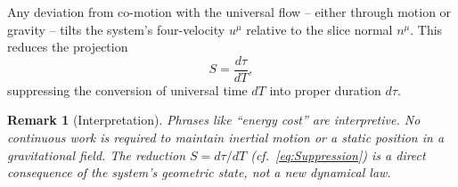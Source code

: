 \documentclass[12pt]{article}
\theoremstyle{plain} %
\newtheorem{remark}{Remark}
\begin{document}
\medskip
\noindent
Any deviation from co-motion with the universal flow – either through motion or gravity – tilts the system’s four-velocity $u^\mu$ relative to the slice normal $n^\mu$. This reduces the projection
\begin{equation}
S=\frac{d\tau}{dT},
\label{eq:Projection}
\end{equation}
suppressing the conversion of universal time $dT$ into proper duration $d\tau$.  

\begin{remark}[Interpretation]
Phrases like “energy cost” are interpretive. No continuous work is required to maintain inertial motion or a static position in a gravitational field. The reduction $S=d\tau/dT$ (cf.~\eqref{eq:Suppression}) is a direct consequence of the system’s geometric state, not a new dynamical law.
\end{remark}
\end{document}
